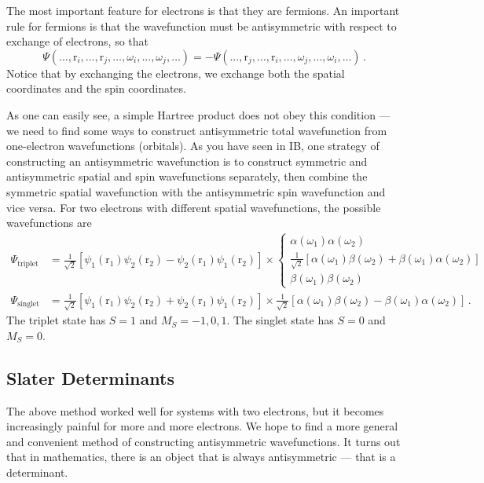 \documentclass{article}
\theoremstyle{plain}\theoremheaderfont{\normalfont\itshape}\theorembodyfont{\rmfamily}\theoremseparator{.}\newtheorem*{rem}{Remark}\newtheorem*{ex}{Example}\newtheorem*{proof}{Proof}\newtheorem*{altp}{Alternative proof}
\theoremstyle{plain}\theoremheaderfont{\normalfont\bfseries}\theorembodyfont{\rmfamily}\theoremseparator{.}\newtheorem{thm}{Theorem}[section]\newtheorem{lem}[thm]{Lemma}\newtheorem{prop}[thm]{Proposition}\newtheorem*{cor}{Corollary}\newtheorem{defn}[thm]{Definition}\newtheorem{clm}[thm]{Claim}\newtheorem{clminproof}{Claim}\newtheorem{pos}{Postulate}[section]
\theoremstyle{break}\theoremheaderfont{\normalfont\itshape}\theorembodyfont{\rmfamily}\theoremseparator{.\medskip}\newtheorem*{proofskip}{Proof}\newtheorem*{exs}{Examples}\newtheorem*{rems}{Remarks}
\theoremstyle{break}\theoremheaderfont{\normalfont\bfseries}\theorembodyfont{\rmfamily}\theoremseparator{.\medskip}\newtheorem{lemskip}[thm]{Lemma}\newtheorem{defnskip}[thm]{Definition}\newtheorem{propskip}[thm]{Proposition}\newtheorem{thmskip}[thm]{Theorem}
\numberwithin{equation}{section}
\newcommand{\vb}[1]{\bm{\mathrm{#1}}}
\begin{document}
    The most important feature for electrons is that they are fermions. An important rule for fermions is that the wavefunction must be antisymmetric with respect to exchange of electrons, so that
    \begin{equation}
        \Psi(\dots,\vb{r}_i,\dots,\vb{r}_j,\dots,\omega_i,\dots,\omega_j,\dots)=-\Psi(\dots,\vb{r}_j,\dots,\vb{r}_i,\dots,\omega_j,\dots,\omega_i,\dots)\,.
    \end{equation}
    Notice that by exchanging the electrons, we exchange both the spatial coordinates and the spin coordinates.
    
    As one can easily see, a simple Hartree product does not obey this condition --- we need to find some ways to construct antisymmetric total wavefunction from one-electron wavefunctions (orbitals). As you have seen in IB, one strategy of constructing an antisymmetric wavefunction is to construct symmetric and antisymmetric spatial and spin wavefunctions separately, then combine the symmetric spatial wavefunction with the antisymmetric spin wavefunction and vice versa. For two electrons with different spatial wavefunctions, the possible wavefunctions are
    \begin{align}
        \Psi_{\text{triplet}}&=\frac{1}{\sqrt{2}}[\psi_1(\vb{r}_1)\psi_2(\vb{r}_2)-\psi_2(\vb{r}_1)\psi_1(\vb{r}_2)]\times\begin{cases}
            \alpha(\omega_1)\alpha(\omega_2)\\
            \frac{1}{\sqrt{2}}[\alpha(\omega_1)\beta(\omega_2)+\beta(\omega_1)\alpha(\omega_2)]\\
            \beta(\omega_1)\beta(\omega_2)
        \end{cases}\\
        \Psi_{\text{singlet}}&=\frac{1}{\sqrt{2}}[\psi_1(\vb{r}_1)\psi_2(\vb{r}_2)+\psi_2(\vb{r}_1)\psi_1(\vb{r}_2)]\times\frac{1}{\sqrt{2}}[\alpha(\omega_1)\beta(\omega_2)-\beta(\omega_1)\alpha(\omega_2)]\,.
    \end{align}
    The triplet state has \(S=1\) and \(M_S=-1,0,1\). The singlet state has \(S=0\) and \(M_S=0\).

    \subsection{Slater Determinants}
    The above method worked well for systems with two electrons, but it becomes increasingly painful for more and more electrons. We hope to find a more general and convenient method of constructing antisymmetric wavefunctions. It turns out that in mathematics, there is an object that is always antisymmetric --- that is a determinant.
\end{document}
